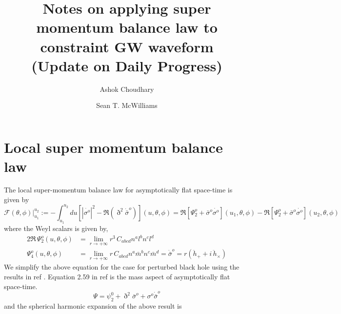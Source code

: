 \documentclass[prd,preprintnumbers,onecolumn,eqsecnum,floatfix,letter]{revtex4}
\begin{document}
\newcommand{\be}{\begin{equation}}
\newcommand{\ee}{\end{equation}}
\newcommand{\ber}{\begin{eqnarray}}
\newcommand{\eer}{\end{eqnarray}}
\def\bea{\begin{eqnarray}}
\def\eea{\end{eqnarray}}
\newcommand{\etal}{\emph{et al.}}


\title{Notes on applying super momentum balance law to constraint GW waveform \\ (Update on Daily Progress) }
\author{Ashok Choudhary}
\author{Sean T. McWilliams}

\begin{abstract}
\end{abstract}

\maketitle

\section{Local super momentum balance law}

The local super-momentum balance law for asymptotically flat space-time is given by 
\begin{equation}
\mathcal{F}(\theta,\phi) \Big|^{u_{2}}_{u_{1}}  := -\int_{u_{1}}^{u_{2}} du \left[|\dot{\sigma^{o}}|^{2} - \Re\left(\eth^{2}\dot{\bar{\sigma}}^{o} \right) \right](u, \theta, \phi) = \Re\left[\Psi^{o}_{2} + \bar{\sigma}^{o}\dot{\sigma^{o}}\right]\left(u_{1}, \theta, \phi\right) - \Re\left[\Psi^{o}_{2} + \bar{\sigma}^{o}\dot{\sigma^{o}}\right]\left(u_{2}, \theta, \phi\right) 
\label{superMomentumBalanceLaw}
\end{equation}
where the Weyl scalars is given by,
\begin{align}
	2 \Re\, \Psi^{o}_{2}\left(u, \theta, \phi \right) & = \lim_{r \to +\infty} r^{3} \, C_{abcd}n^{a}l^{b}n^{c}l^{d}\label{psi2}\\  \Psi^{o}_{4}\left(u, \theta, \phi \right) & = \lim_{r \to +\infty} r \, C_{abcd}n^{a}\bar{m}^{b}n^{c} \bar{m}^{d} = \ddot{\bar{\sigma}}^{o} = r\left(\ddot{h}_{+} + i\, \ddot{h}_{\times}  \right)
	\label{psi4}
\end{align}
We simplify the above equation for the case for perturbed black hole using the results in ref \cite{Adamo_2009}. Equation 2.59 in ref\cite{Adamo_2009} is the mass aspect of asymptotically flat space-time. 
\begin{equation}
	\Psi = \psi^{0}_{2} + \eth^{2}\bar{\sigma}^{o} + {\sigma}^{o}\dot{\bar{\sigma}}^{o}
\end{equation}
and the spherical harmonic expansion of the above result is
\end{document}
